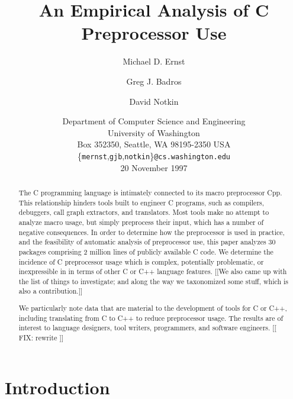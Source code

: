 \documentclass[10pt]{article}
\def\numpackages{30}
\def\numlines{2 million}
\begin{document}
% 


\title{An Empirical Analysis of C Preprocessor Use}

\author{Michael D. Ernst \and Greg J. Badros \and David Notkin}

\date{%
Department of Computer Science and Engineering \\
University of Washington \\
Box 352350, Seattle, WA  98195-2350  USA \\
{\small \{{\tt mernst},{\tt gjb},{\tt notkin}\}{\tt @cs.washington.edu}} \\
20 November 1997}  

\maketitle

\begin{abstract}
  The C programming language is intimately connected to its macro
  preprocessor Cpp.  This relationship hinders tools built to engineer C
  programs, such as compilers, debuggers, call graph extractors, and
  translators.  Most tools make no attempt to analyze macro usage, but simply
  preprocess their input, which has a number of negative consequences.  In
  order to determine how the preprocessor is used in practice, and the
  feasibility of automatic analysis of preprocessor use, this paper
  analyzes {\numpackages} packages comprising {\numlines} lines of publicly
  available C code.  We determine the incidence of C preprocessor usage which
  is complex, potentially problematic, or inexpressible in in terms of
  other C or C++ language features.
[[We also came up with the list of things to investigate; and along the way
we taxonomized some stuff, which is also a contribution.]]

  We particularly note data that are
  material to the development of tools for C or C++, including translating
  from C to C++ to reduce preprocessor usage.  The results are of interest
  to language designers, tool writers, programmers, and software
  engineers.
[[ FIX: rewrite ]]
\end{abstract}

\bigskip

\section{Introduction}
\end{document}
